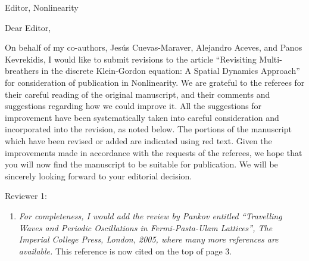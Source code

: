 \documentclass[11pt]{letter}
\begin{document}
\address{Ross Parker \\
Department of Mathematics \\
Southern Methodist University \\
Dallas, TX 75275 \\
\texttt{rhparker@smu.edu}}%
\signature{Ross Parker}
\begin{letter}{Editor, Nonlinearity}

\opening{Dear Editor,}

On behalf of my co-authors, Jes\'us Cuevas-Maraver, Alejandro Aceves, and Panos Kevrekidis, I would like to submit revisions to the article ``Revisiting Multi-breathers in the discrete Klein-Gordon equation: A Spatial Dynamics Approach'' for consideration of publication in Nonlinearity. We are grateful to the referees for their careful reading of the original manuscript, and their comments and suggestions regarding how we could improve it. All the suggestions for improvement have been systematically taken into careful consideration and incorporated into the revision, as noted below. The portions of the manuscript which have been revised or added are indicated using red text. Given the improvements made in accordance with the requests of the referees, we hope that you will now find the manuscript to be suitable for publication. We will be sincerely looking forward to your editorial decision.


Reviewer 1:
\begin{enumerate}
    \item \emph{For completeness, I would add the review by Pankov entitled ``Travelling Waves and Periodic Oscillations in Fermi-Pasta-Ulam Lattices'', The Imperial College Press, London, 2005, where many more references are available.} 
    This reference is now cited on the top of page 3.
    \vspace{4mm}


\end{enumerate}
\end{letter}
\end{document}
